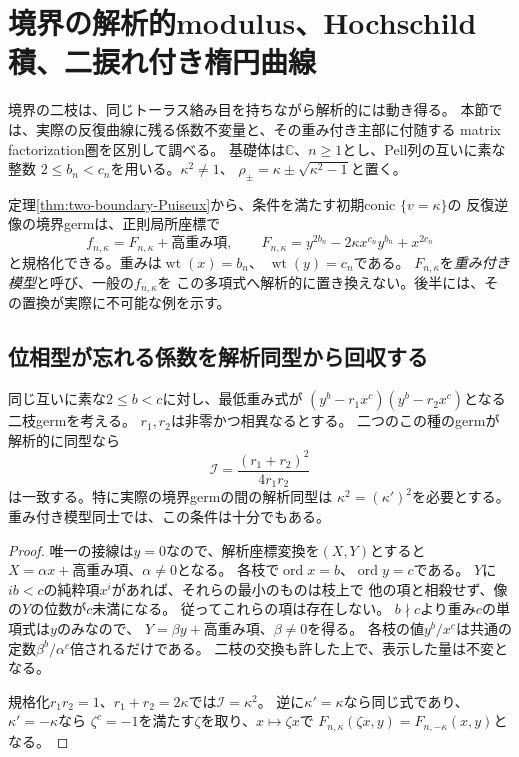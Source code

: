 \section{境界の解析的modulus、Hochschild積、二捩れ付き楕円曲線}
\label{sec:boundary-analytic-moduli}
境界の二枝は、同じトーラス絡み目を持ちながら解析的には動き得る。
本節では、実際の反復曲線に残る係数不変量と、その重み付き主部に付随する
matrix factorization圏を区別して調べる。
基礎体は$\mathbb C$、$n\ge1$とし、Pell列の互いに素な整数
$2\le b_n<c_n$を用いる。$\kappa^2\ne1$、
$\rho_\pm=\kappa\pm\sqrt{\kappa^2-1}$と置く。

定理\ref{thm:two-boundary-Puiseux}から、条件を満たす初期conic $\{v=\kappa\}$の
反復逆像の境界germは、正則局所座標で
\begin{equation}\label{eq:boundary-weighted-model}
 f_{n,\kappa}=F_{n,\kappa}+\text{高重み項},\qquad
 F_{n,\kappa}=y^{2b_n}-2\kappa x^{c_n}y^{b_n}+x^{2c_n}
\end{equation}
と規格化できる。重みは$\operatorname{wt}(x)=b_n$、
$\operatorname{wt}(y)=c_n$である。
$F_{n,\kappa}$を\emph{重み付き模型}と呼び、一般の$f_{n,\kappa}$を
この多項式へ解析的に置き換えない。後半には、その置換が実際に不可能な例を示す。

\subsection{位相型が忘れる係数を解析同型から回収する}
\begin{proposition}[二枝の先頭係数の不変量]
\label{prop:boundary-kappa-analytic-invariant}
同じ互いに素な$2\le b<c$に対し、最低重み式が
$(y^b-r_1x^c)(y^b-r_2x^c)$となる二枝germを考える。
$r_1,r_2$は非零かつ相異なるとする。
二つのこの種のgermが解析的に同型なら
\[
 \mathcal I=\frac{(r_1+r_2)^2}{4r_1r_2}
\]
は一致する。特に実際の境界germの間の解析同型は
$\kappa^2=(\kappa')^2$を必要とする。
重み付き模型同士では、この条件は十分でもある。
\end{proposition}
\begin{proof}
唯一の接線は$y=0$なので、解析座標変換を$(X,Y)$とすると
$X=\alpha x+\text{高重み項}$、$\alpha\ne0$となる。
各枝で$\operatorname{ord}x=b$、$\operatorname{ord}y=c$である。
$Y$に$ib<c$の純粋項$x^i$があれば、それらの最小のものは枝上で
他の項と相殺せず、像の$Y$の位数が$c$未満になる。
従ってこれらの項は存在しない。
$b\nmid c$より重み$c$の単項式は$y$のみなので、
$Y=\beta y+\text{高重み項}$、$\beta\ne0$を得る。
各枝の値$y^b/x^c$は共通の定数$\beta^b/\alpha^c$倍されるだけである。
二枝の交換も許した上で、表示した量は不変となる。

規格化$r_1r_2=1$、$r_1+r_2=2\kappa$では$\mathcal I=\kappa^2$。
逆に$\kappa'=\kappa$なら同じ式であり、$\kappa'=-\kappa$なら
$\zeta^c=-1$を満たす$\zeta$を取り、$x\mapsto\zeta x$で
$F_{n,\kappa}(\zeta x,y)=F_{n,-\kappa}(x,y)$となる。
\end{proof}

